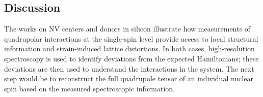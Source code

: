 


\subsection*{Discussion}

The works on NV centers and donors in silicon illustrate how measurements of quadrupolar interactions at the single-spin level provide access to local structural information and strain-induced lattice distortions. In both cases, high-resolution spectroscopy is used to identify deviations from the expected Hamiltonians; these deviations are then used to understand the interactions in the system. The next step would be to reconstruct the full quadrupole tensor of an individual nuclear spin based on the measured spectroscopic information.

